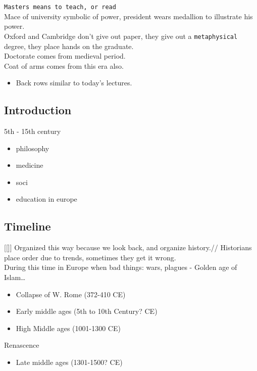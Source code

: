 \documentclass[11pt]{article}
\begin{document}
\texttt{Masters means to teach, or read}\\
Mace of university symbolic of power, president wears medallion to illustrate his power.\\

Oxford and Cambridge don't give out paper, they give out a \texttt{metaphysical} degree, they place hands on the graduate.\\
Doctorate comes from medieval period.\\
Coat of arms comes from this era also.\\

\begin{itemize}
\item Back rows similar to today's lectures.
\end{itemize}

\subsection{Introduction}
\label{sec-7-2}
5th - 15th century \\
\begin{itemize}
\item philosophy
\item medicine
\item soci
\item education in europe
\end{itemize}

\subsection{Timeline}
\label{sec-7-3}
[[]]
Organized this way because we look back, and organize history.//
Historians place order due to trends, sometimes they get it wrong.\\
During this time in Europe when bad things: wars, plagues - Golden age of Islam\ldots{}

\begin{itemize}
\item Collapse of W. Rome (372-410 CE)\\
\item Early middle ages (5th to 10th Century? CE)\\
\item High Middle ages (1001-1300 CE) \\
\end{itemize}
Renascence
\begin{itemize}
\item Late middle ages (1301-1500? CE)\\
\end{itemize}
\end{document}
